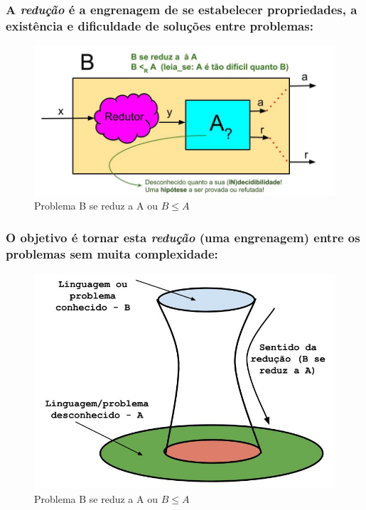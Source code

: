 \documentclass[10pt]{beamer}
\begin{document}
\begin{frame}[fragile]
\frametitle{A \emph{redução} é a \textbf{engrenagem} de se estabelecer propriedades, a existência e dificuldade de soluções entre problemas:}
\begin{figure}[!ht]
	\centering
	\includegraphics[height =.7\textheight,width=.8\textwidth]
	{figuras/reducao-classica.jpg}
	\caption{Problema B se reduz a A ou $ B \le A$}
\end{figure}
\end{frame}


\begin{frame}[fragile]
\frametitle{O objetivo é tornar esta \emph{redução} (uma \textbf{engrenagem}) entre os problemas sem muita complexidade:}
\begin{figure}[!ht]
	\centering
	\includegraphics[height =.7\textheight,width=.8\textwidth]
	{figuras/reducao-via-mapeamento.jpg}
	\caption{Problema B se reduz a A ou $ B \le A$}
\end{figure}
\end{frame}
\end{document}
